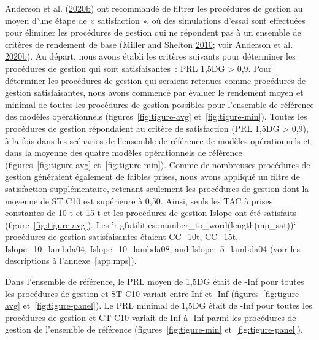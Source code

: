 \documentclass[11pt]{book}
\begin{document}
Anderson et al. (\protect\hyperlink{ref-anderson2020gfmp}{2020}\protect\hyperlink{ref-anderson2020gfmp}{b}) ont recommandé de filtrer les procédures de gestion au moyen d'une étape de « satisfaction », où des simulations d'essai sont effectuées pour éliminer les procédures de gestion qui ne répondent pas à un ensemble de critères de rendement de base (Miller and Shelton \protect\hyperlink{ref-miller2010}{2010}; voir Anderson et al. \protect\hyperlink{ref-anderson2020gfmp}{2020}\protect\hyperlink{ref-anderson2020gfmp}{b}). Au départ, nous avons établi les critères suivants pour déterminer les procédures de gestion qui sont satisfaisantes~: PRL 1,5DG \textgreater{} 0,9. Pour déterminer les procédures de gestion qui seraient retenues comme procédures de gestion satisfaisantes, nous avons commencé par évaluer le rendement moyen et minimal de toutes les procédures de gestion possibles pour l'ensemble de référence des modèles opérationnels (figures~\ref{fig:tigure-avg} et~\ref{fig:tigure-min}). Toutes les procédures de gestion répondaient au critère de satisfaction (PRL 1,5DG \textgreater{} 0,9), à la fois dans les scénarios de l'ensemble de référence de modèles opérationnels et dans la moyenne des quatre modèles opérationnels de référence (figures~\ref{fig:tigure-avg} et~\ref{fig:tigure-min}). Comme de nombreuses procédures de gestion généraient également de faibles prises, nous avons appliqué un filtre de satisfaction supplémentaire, retenant seulement les procédures de gestion dont la moyenne de ST C10 est supérieure à 0,50. Ainsi, seuls les TAC à prises constantes de 10 t et 15 t et les procédures de gestion Islope ont été satisfaits (figure~\ref{fig:tigure-avg}). Les 'r gfutilities::number\_to\_word(length(mp\_sat))` procédures de gestion satisfaisantes étaient CC\_10t, CC\_15t, Islope\_10\_lambda04, Islope\_10\_lambda08, and Islope\_5\_lambda04 (voir les descriptions à l'annexe~\ref{app:mps}).

Dans l'ensemble de référence, le PRL moyen de 1,5DG était de -Inf pour toutes les procédures de gestion et ST C10 variait entre Inf et -Inf (figures~\ref{fig:tigure-avg} et~\ref{fig:tigure-panel}). Le PRL minimal de 1,5DG était de -Inf pour toutes les procédures de gestion et CT C10 variait de Inf à -Inf parmi les procédures de gestion de l'ensemble de référence (figures~\ref{fig:tigure-min} et~\ref{fig:tigure-panel}).
\end{document}
